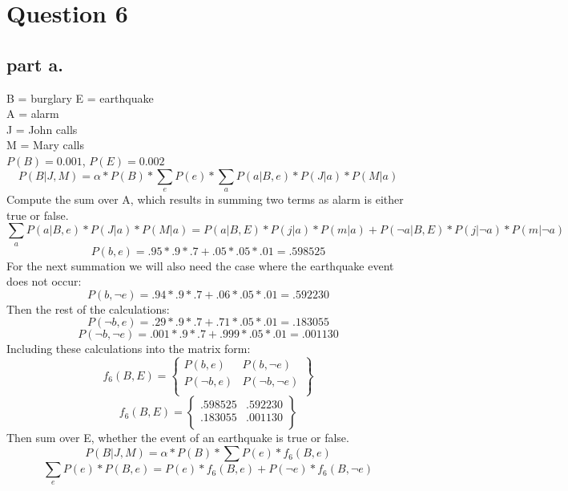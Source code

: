 \section{Question 6}

\subsection{part a.}
B = burglary 
E = earthquake \\
A = alarm \\
J = John calls \\
M = Mary calls \\
$P(B) = 0.001 $, $P(E) = 0.002$
\[P(B | J,M) = \alpha * P(B) * \sum_e{P(e) * \sum_a{P(a|B,e) * P(J|a) * P(M|a)}}
\]
Compute the sum over A, which results in summing two terms as alarm is either true or false.
\[\sum_{a}{P(a|B,e) * P(J|a) * P(M|a)} =
P(a|B,E)*P(j|a) * P(m|a) + P(\neg a|B,E) * P(j|\neg a)*P(m|\neg a)
\]
\[P(b, e) = .95 * .9 * .7 + .05 * .05 * .01 = .598525
\]
For the next summation we will also need the case where the earthquake event does not occur:
\[P(b,\neg e) = .94 * .9 * .7 + .06 * .05 * .01 = .592230
\]
Then the rest of the calculations:
\[P(\neg b, e) = .29 * .9 * .7 + .71 * .05 * .01 = .183055
\]
\[P(\neg b,\neg e) = .001 * .9 * .7 + .999 * .05 * .01 = .001130
\]
Including these calculations into the matrix form:
\[
f_6(B,E) = \begin{Bmatrix}
P(b,e) & P(b, \neg e) \\
P(\neg b, e) & P(\neg b, \neg e) \\
\end{Bmatrix}
\]
\[
f_6(B,E) = \begin{Bmatrix}
.598525 & .592230 \\
.183055 & .001130 \\
\end{Bmatrix}
\]
Then sum over E, whether the event of an earthquake is true or false.
\[ P(B | J, M) = \alpha * P(B) * \sum{P(e) * f_6(B,e)}
\]
\[
\sum_e{P(e) * P(B,e)} = P(e)* f_6(B,e) + P(\neg e) * f_6(B, \neg e)
\]

